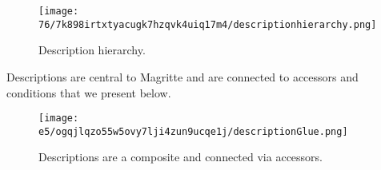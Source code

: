 \documentclass[a4paper,10pt,twoside]{book}
\begin{document}
\begin{figure}[h!tbp]
	\begin{center}
		\texttt{[image: 76/7k898irtxtyacugk7hzqvk4uiq17m4/descriptionhierarchy.png]}
		\caption{Description hierarchy.\label{book:advanced:magritte:descriptions:description}}
	\end{center}
\end{figure}


Descriptions are central to Magritte and are connected to accessors and conditions that we present below. 

\begin{figure}[h!tbp]
	\begin{center}
		\texttt{[image: e5/ogqjlqzo55w5ovy7lji4zun9ucqe1j/descriptionGlue.png]}
		\caption{Descriptions are a composite and connected via accessors.\label{book:advanced:magritte:descriptions:centralGlue}}
	\end{center}
\end{figure}
\end{document}
